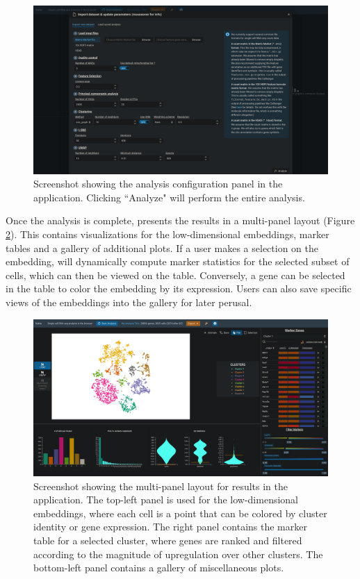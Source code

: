 \documentclass{article}
\begin{document}
\begin{figure}[htbp]
\begin{center}
\includegraphics[width=\textwidth]{screenshots/analysis.png}
\end{center}
\caption{Screenshot showing the analysis configuration panel in the  application.
Clicking ``Analyze" will perform the entire analysis.}
\label{screenshot:analysis}
\end{figure}

Once the analysis is complete,  presents the results in a multi-panel layout (Figure \ref{screenshot:results}).
This contains visualizations for the low-dimensional embeddings, marker tables and a gallery of additional plots.
If a user makes a selection on the embedding,  will dynamically compute marker statistics for the selected subset of cells, which can then be viewed on the table.
Conversely, a gene can be selected in the table to color the embedding by its expression. 
Users can also save specific views of the embeddings into the gallery for later perusal.

\begin{figure}[htbp]
\begin{center}
\includegraphics[width=\textwidth]{screenshots/results.png}
\end{center}
\caption{Screenshot showing the multi-panel layout for results in the  application.
The top-left panel is used for the low-dimensional embeddings, where each cell is a point that can be colored by cluster identity or gene expression.
The right panel contains the marker table for a selected cluster, where genes are ranked and filtered according to the magnitude of upregulation over other clusters.
The bottom-left panel contains a gallery of miscellaneous plots.}
\label{screenshot:results}
\end{figure}
\end{document}
